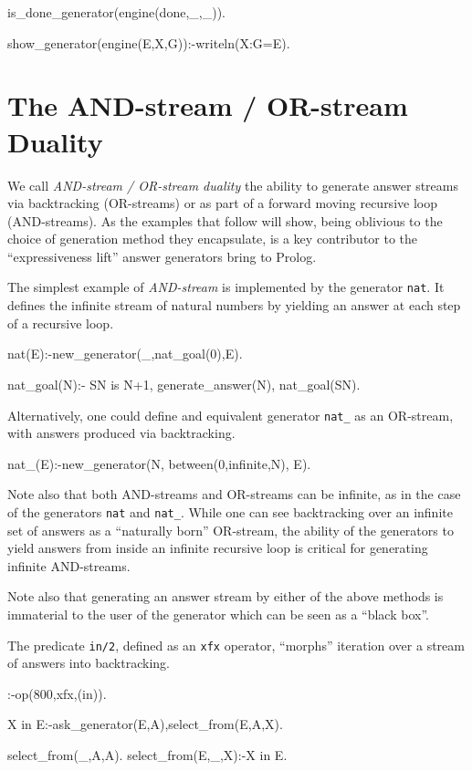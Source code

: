 \documentclass{new_tlp}
\begin{document}
\begin{code}
is_done_generator(engine(done,_,_)).
\end{code}

\begin{codeh}
show_generator(engine(E,X,G)):-writeln(X:G=E).
\end{codeh}

\section{The AND-stream / OR-stream Duality}

We call {\em AND-stream / OR-stream duality} the
ability to generate answer streams via backtracking (OR-streams) or
as part of a forward moving recursive loop (AND-streams).
As the examples that follow will show,
being oblivious to the choice of generation method they encapsulate,
is a key contributor to the ``expressiveness lift'' answer generators
bring to Prolog.

The simplest example of {\em AND-stream} is  implemented
by the generator {\tt nat}. It defines the infinite stream of natural numbers 
by yielding an answer at each step of a recursive loop.
\begin{code}
nat(E):-new_generator(_,nat_goal(0),E).

nat_goal(N):-
  SN is N+1,
  generate_answer(N),
  nat_goal(SN).
\end{code}

Alternatively, one could define 
and equivalent generator {\tt nat\_} as an OR-stream,  with answers 
produced via  backtracking.

\begin{code}
nat_(E):-new_generator(N, between(0,infinite,N), E).
\end{code}

Note also that both AND-streams and OR-streams can be infinite, as in the
case of the generators {\tt nat} and {\tt nat\_}.
While one can see backtracking over an infinite set of answers as
a ``naturally born'' OR-stream, the ability of the generators to
yield answers from inside an infinite recursive loop is critical
for generating infinite AND-streams.

Note also that generating an answer stream by either of the above methods
is immaterial to the user of the generator which can be seen as a ``black box''.

The predicate {\tt in/2}, defined as an {\tt xfx} operator,
``morphs'' iteration over  a stream of answers into backtracking.
\begin{code}
:-op(800,xfx,(in)).

X in E:-ask_generator(E,A),select_from(E,A,X).

select_from(_,A,A).
select_from(E,_,X):-X in E.
\end{code}
\end{document}
